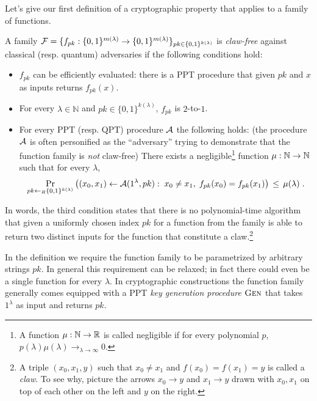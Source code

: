Let's give our first definition of a cryptographic property that applies to a family of functions. 

\begin{definition}
A family $\mathcal{F} = \{f_{pk}: \{0,1\}^{m(\lambda)} \to \{0,1\}^{m(\lambda)}\}_{pk\in\{0,1\}^{k(\lambda)}}$ is \emph{claw-free} against classical (resp. quantum) adversaries if 
the following conditions hold:
\begin{itemize}
\item $f_{pk}$ can be efficiently evaluated: there is a PPT procedure that given $pk$ and $x$ as inputs returns $f_{pk}(x)$.
\item For every $\lambda\in \mathbb{N}$ and  $pk\in\{0,1\}^{k(\lambda)}$, $f_{pk}$ is $2$-to-$1$.
\item For every PPT (resp. QPT) procedure $\mathcal{A}$ the following holds: (the procedure $\mathcal{A}$ is often personified as the ``adversary'' trying to demonstrate that the function family is \emph{not} claw-free) There exists a negligible\footnote{A function $\mu:\mathbb{N}\to\mathbb{R}$ is called {negligible} if for every polynomial $p$, $p(\lambda)\mu(\lambda)\to_{\lambda\to\infty} 0$.} function $\mu:\mathbb{N}\to\mathbb{N}$ such that for every $\lambda$, 
\[ \Pr_{pk\leftarrow_R \{0,1\}^{k(\lambda)}}\big( (x_0,x_1)\leftarrow \mathcal{A}(1^\lambda,pk):\; x_0\neq x_1,\; f_{pk}(x_0)= f_{pk}(x_1)\big) \,\leq\, \mu(\lambda)\;.\]
\end{itemize}
\end{definition}

In words, the third condition states that there is no polynomial-time algorithm that given a uniformly chosen index $pk$ for a function from the family is able to return two distinct inputs for the function that constitute a claw.\footnote{A triple $(x_0,x_1,y)$ such that $x_0\neq x_1$ and $f(x_0)=f(x_1)=y$ is called a \emph{claw}. To see why, picture the arrows $x_0\rightarrow y$ and $x_1\rightarrow y$ drawn with $x_0,x_1$ on top of each other on the left and $y$ on the right.}

\begin{remark}
In the definition we require the function family to be parametrized by arbitrary strings $pk$. In general this requirement can be relaxed; in fact there could even be a single function for every $\lambda$. In cryptographic constructions the function family generally comes equipped with a PPT \emph{key generation procedure} $\textsc{Gen}$ that takes $1^\lambda$ as input and returns $pk$.
\end{remark}

